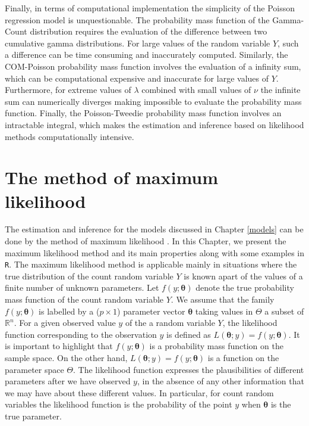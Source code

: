 \documentclass[9pt,a5paper,]{book}
\theoremstyle{definition}
\theoremstyle{definition}
\theoremstyle{remark}
\begin{document}
Finally, in terms of computational implementation the simplicity of the
Poisson regression model is unquestionable. The probability mass
function of the Gamma-Count distribution requires the evaluation of the
difference between two cumulative gamma distributions. For large values
of the random variable \(Y\), such a difference can be time consuming
and inaccurately computed. Similarly, the COM-Poisson probability mass
function involves the evaluation of a infinity sum, which can be
computational expensive and inaccurate for large values of \(Y\).
Furthermore, for extreme values of \(\lambda\) combined with small
values of \(\nu\) the infinite sum can numerically diverges making
impossible to evaluate the probability mass function. Finally, the
Poisson-Tweedie probability mass function involves an intractable
integral, which makes the estimation and inference based on likelihood
methods computationally intensive.

\chapter{The method of maximum likelihood}\label{likelihood}

The estimation and inference for the models discussed in Chapter
\ref{models} can be done by the method of maximum likelihood
\citep{Silvey:1975}. In this Chapter, we present the maximum likelihood
method and its main properties along with some examples in \texttt{R}.
The maximum likelihood method is applicable mainly in situations where
the true distribution of the count random variable \(Y\) is known apart
of the values of a finite number of unknown parameters. Let
\(f(y;\boldsymbol{\theta})\) denote the true probability mass function
of the count random variable \(Y\). We assume that the family
\(f(y;\boldsymbol{\theta})\) is labelled by a (\(p \times 1\)) parameter
vector \(\boldsymbol{\theta}\) taking values in \(\Theta\) a subset of
\(\mathbb{R}^n\). For a given observed value \(y\) of the a random
variable \(Y\), the likelihood function corresponding to the observation
\(y\) is defined as
\(L(\boldsymbol{\theta};y) = f(y;\boldsymbol{\theta})\). It is important
to highlight that \(f(y;\boldsymbol{\theta})\) is a probability mass
function on the sample space. On the other hand,
\(L(\boldsymbol{\theta};y) = f(y;\boldsymbol{\theta})\) is a function on
the parameter space \(\Theta\). The likelihood function expresses the
plausibilities of different parameters after we have observed \(y\), in
the absence of any other information that we may have about these
different values. In particular, for count random variables the
likelihood function is the probability of the point \(y\) when
\(\boldsymbol{\theta}\) is the true parameter.
\end{document}
